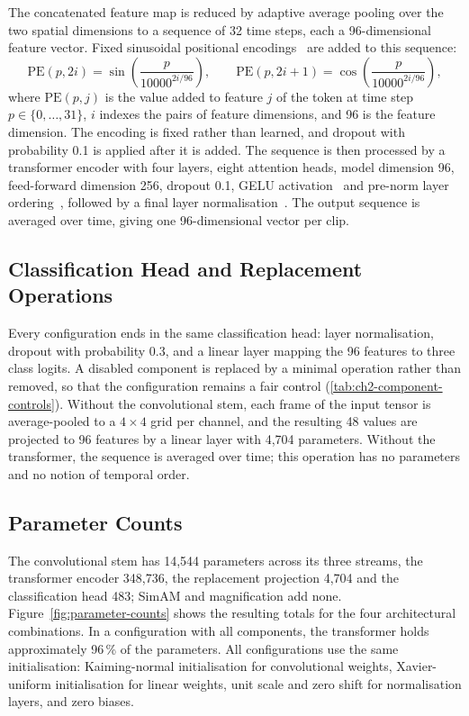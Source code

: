 The concatenated feature map is reduced by adaptive average pooling over the two spatial dimensions to a sequence of 32 time steps, each a 96-dimensional feature vector. Fixed sinusoidal positional encodings~\cite{vaswani2017} are added to this sequence:
\begin{equation}
	\mathrm{PE}(p, 2i) = \sin\!\left(\frac{p}{10000^{2i/96}}\right), \qquad \mathrm{PE}(p, 2i+1) = \cos\!\left(\frac{p}{10000^{2i/96}}\right),
	\label{eq:positional-encoding}
\end{equation}
where $\mathrm{PE}(p, j)$ is the value added to feature $j$ of the token at time step $p \in \{0, \dots, 31\}$, $i$ indexes the pairs of feature dimensions, and 96 is the feature dimension. The encoding is fixed rather than learned, and dropout with probability 0.1 is applied after it is added. The sequence is then processed by a transformer encoder with four layers, eight attention heads, model dimension 96, feed-forward dimension 256, dropout 0.1, GELU activation~\cite{hendrycks2016} and pre-norm layer ordering~\cite{xiong2020}, followed by a final layer normalisation~\cite{ba2016}. The output sequence is averaged over time, giving one 96-dimensional vector per clip.

\subsection{Classification Head and Replacement Operations}
\label{sec:classifier-head}
\label{sec:fallbacks-config}

Every configuration ends in the same classification head: layer normalisation, dropout with probability 0.3, and a linear layer mapping the 96 features to three class logits. A disabled component is replaced by a minimal operation rather than removed, so that the configuration remains a fair control (\autoref{tab:ch2-component-controls}). Without the convolutional stem, each frame of the input tensor is average-pooled to a $4\times4$ grid per channel, and the resulting 48 values are projected to 96 features by a linear layer with 4,704 parameters. Without the transformer, the sequence is averaged over time; this operation has no parameters and no notion of temporal order.

\subsection{Parameter Counts}
\label{sec:parameter-counts}
\label{sec:weight-init}

The convolutional stem has 14,544 parameters across its three streams, the transformer encoder 348,736, the replacement projection 4,704 and the classification head 483; SimAM and magnification add none. Figure~\ref{fig:parameter-counts} shows the resulting totals for the four architectural combinations. In a configuration with all components, the transformer holds approximately 96\,\% of the parameters. All configurations use the same initialisation: Kaiming-normal initialisation for convolutional weights, Xavier-uniform initialisation for linear weights, unit scale and zero shift for normalisation layers, and zero biases.

